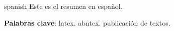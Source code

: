 \begin{resumo}[Resumen]
 \begin{otherlanguage*}{spanish}
   Este es el resumen en español.
  
   \textbf{Palabras clave}: latex. abntex. publicación de textos. %
 \end{otherlanguage*}
\end{resumo}